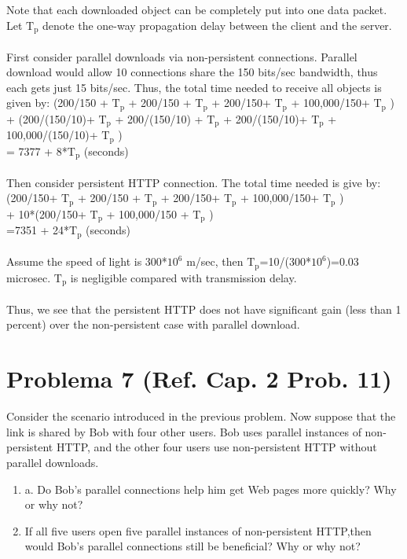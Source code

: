 \documentclass[10pt,spanish]{article}
\numberwithin{figure}{section} %
\begin{document}
Note that each downloaded object can be completely put into one data packet. Let $\mathrm{T_p}$ denote the one-way propagation delay between the client and the server.\\
 \\
First consider parallel downloads via non-persistent connections. Parallel download would allow 10 connections share the 150 bits/sec bandwidth, thus each gets just 15 bits/sec. Thus, the total time needed to receive all objects is given by:
(200/150 + $\mathrm{T_p}$ + 200/150 + $\mathrm{T_p}$ + 200/150+ $\mathrm{T_p}$ + 100,000/150+ $\mathrm{T_p}$ )\\
+ (200/(150/10)+ $\mathrm{T_p}$ + 200/(150/10) + $\mathrm{T_p}$ + 200/(150/10)+ $\mathrm{T_p}$ + 100,000/(150/10)+ $\mathrm{T_p}$ )\\
= 7377 + 8*$\mathrm{T_p}$ (seconds)\\
 \\
Then consider persistent HTTP connection. The total time needed is give by: (200/150+ $\mathrm{T_p}$ + 200/150 + $\mathrm{T_p}$ + 200/150+ $\mathrm{T_p}$ + 100,000/150+ $\mathrm{T_p}$ )\\
+ 10*(200/150+ $\mathrm{T_p}$ + 100,000/150 + $\mathrm{T_p}$ )\\
=7351 + 24*$\mathrm{T_p}$ (seconds)\\
 \\
Assume the speed of light is 300*$10^6$ m/sec, then $\mathrm{T_p}$=10/(300*$10^6$)=0.03 microsec. $\mathrm{T_p}$ is negligible compared with transmission delay.\\
 \\
Thus, we see that the persistent HTTP does not have significant gain (less than 1 percent) over the non-persistent case with parallel download.

\section[Problema 7]{Problema 7 \textnormal{\Large{(Ref. Cap. 2 Prob. 11)}}}

Consider the scenario introduced in the previous problem. Now suppose that the link is shared by Bob with four other users. Bob uses parallel instances of non-persistent HTTP, and the other four users use non-persistent HTTP without parallel downloads.
\begin{enumerate}
\item a. Do Bob's parallel connections help him get Web pages more quickly? Why or why not?
\item If all five users open five parallel instances of non-persistent HTTP,then would Bob’s parallel connections still be beneficial? Why or why not?
\end{enumerate}
\end{document}
